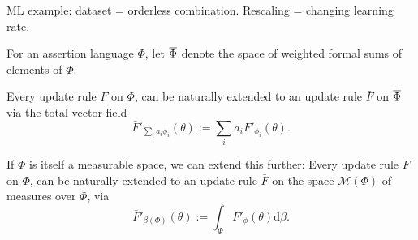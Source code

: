 \begin{prop}
	
\end{prop}

\begin{example}
	ML example: dataset = orderless combination.
	Rescaling = changing learning rate.

	\TODO
	
\end{example}


\begin{defn}
For an assertion language $\Phi$, let $\overline \Phi$ denote
the space of weighted formal sums of elements of $\Phi$.
\end{defn}

\begin{prop}
Every  update rule $F$ on $\Phi$, can be naturally extended to an update rule
$\bar F$ on $\overline \Phi$
via the total vector field
\[
    \bar F'_{\textstyle\sum_i a_i \phi_i} ( \theta ) := \sum_{i} a_i F'_{\phi_i}(\theta).
\]
%
\end{prop}

If $\Phi$ is itself a measurable space, we can extend this further:
Every  update rule $F$ on $\Phi$, can be naturally extended to an update rule $\bar F$ on the space $\mathcal M(\Phi)$ of measures over $\Phi$, via
\[
\bar F'_{\beta(\Phi)}( \theta ) := \int_{\Phi} F'_\phi(\theta) \mathrm d\beta.
\]



%
%

